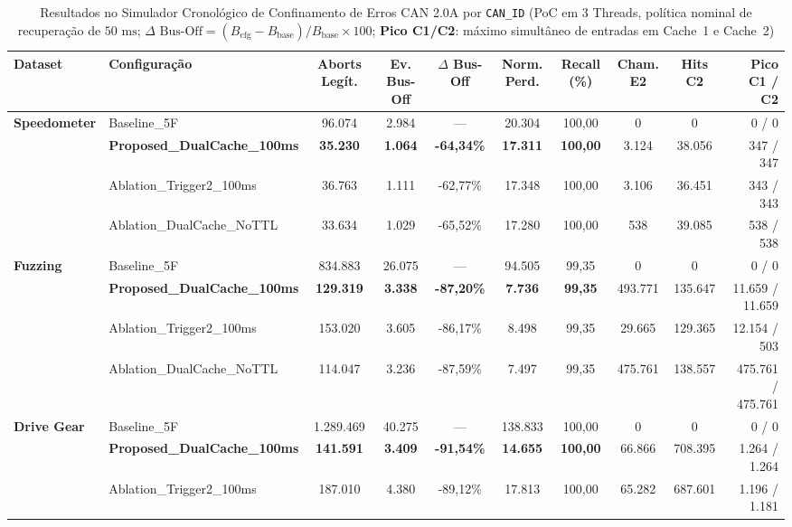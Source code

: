 \documentclass[conference]{IEEEtran}
\begin{document}
\begin{table}[htbp]
\caption{Resultados no Simulador Cronológico de Confinamento de Erros CAN 2.0A por \texttt{CAN\_ID} (PoC em 3 Threads, política nominal de recuperação de $50\text{ ms}$; $\Delta\text{ Bus-Off} = (B_{\text{cfg}} - B_{\text{base}})/B_{\text{base}} \times 100$; \textbf{Pico C1/C2}: máximo simultâneo de entradas em Cache~1 e Cache~2)}
\label{tab:poc_simulation}
\centering
\scriptsize
\setlength{\tabcolsep}{2.8pt}
\begin{tabular}{llcccccccr}
\toprule
\textbf{Dataset} & \textbf{Configuração} & \textbf{Aborts Legít.} & \textbf{Ev. Bus-Off} & \textbf{$\Delta$ Bus-Off} & \textbf{Norm. Perd.} & \textbf{Recall (\%)} & \textbf{Cham. E2} & \textbf{Hits C2} & \textbf{Pico C1 / C2} \\
\midrule
\multirow{4}{*}{\textbf{Speedometer}}
 & Baseline\_5F & 96.074 & 2.984 & --- & 20.304 & 100,00 & 0 & 0 & 0 / 0 \\
 & \textbf{Proposed\_DualCache\_100ms} & \textbf{35.230} & \textbf{1.064} & \textbf{-64,34\%} & \textbf{17.311} & \textbf{100,00} & 3.124 & 38.056 & 347 / 347 \\
 & Ablation\_Trigger2\_100ms & 36.763 & 1.111 & -62,77\% & 17.348 & 100,00 & 3.106 & 36.451 & 343 / 343 \\
 & Ablation\_DualCache\_NoTTL & 33.634 & 1.029 & -65,52\% & 17.280 & 100,00 & 538 & 39.085 & 538 / 538 \\
\midrule
\multirow{4}{*}{\textbf{Fuzzing}}
 & Baseline\_5F & 834.883 & 26.075 & --- & 94.505 & 99,35 & 0 & 0 & 0 / 0 \\
 & \textbf{Proposed\_DualCache\_100ms} & \textbf{129.319} & \textbf{3.338} & \textbf{-87,20\%} & \textbf{7.736} & \textbf{99,35} & 493.771 & 135.647 & 11.659 / 11.659 \\
 & Ablation\_Trigger2\_100ms & 153.020 & 3.605 & -86,17\% & 8.498 & 99,35 & 29.665 & 129.365 & 12.154 / 503 \\
 & Ablation\_DualCache\_NoTTL & 114.047 & 3.236 & -87,59\% & 7.497 & 99,35 & 475.761 & 138.557 & 475.761 / 475.761 \\
\midrule
\multirow{4}{*}{\textbf{Drive Gear}}
 & Baseline\_5F & 1.289.469 & 40.275 & --- & 138.833 & 100,00 & 0 & 0 & 0 / 0 \\
 & \textbf{Proposed\_DualCache\_100ms} & \textbf{141.591} & \textbf{3.409} & \textbf{-91,54\%} & \textbf{14.655} & \textbf{100,00} & 66.866 & 708.395 & 1.264 / 1.264 \\
 & Ablation\_Trigger2\_100ms & 187.010 & 4.380 & -89,12\% & 17.813 & 100,00 & 65.282 & 687.601 & 1.196 / 1.181 \\

\end{tabular}
\end{table}
\end{document}
